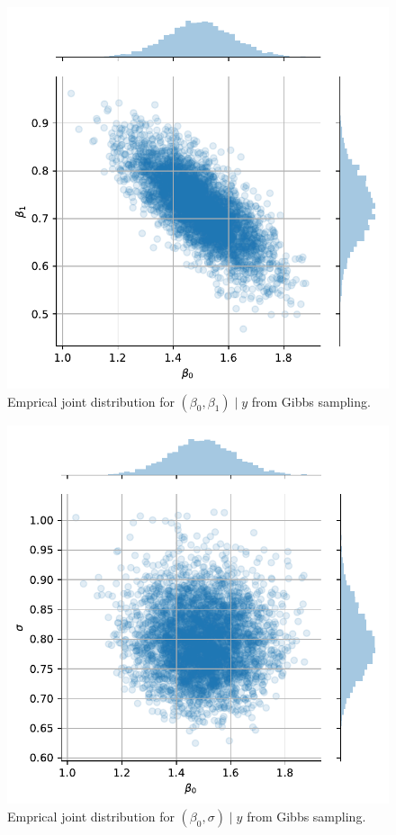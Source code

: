 \documentclass[letterpaper,11pt]{article}
\begin{document}
\begin{enumerate}
\begin{enumerate}
    \begin{figure}      
      \centering
      \caption{Emprical joint distribution for
        $\left(\beta_0,\beta_1\right) \mid y$ from Gibbs sampling.}
      \label{fig:p1_beta0_beta1}
      \includegraphics{p1_beta0_beta1.pdf}
    \end{figure}

    \begin{figure}      
      \centering
      \caption{Emprical joint distribution for
        $\left(\beta_0, \sigma\right) \mid y$ from Gibbs sampling.}
      \label{fig:p1_beta0_sigma}
      \includegraphics{p1_beta0_sigma.pdf}
    \end{figure}


\end{enumerate}
\end{enumerate}
\end{document}
